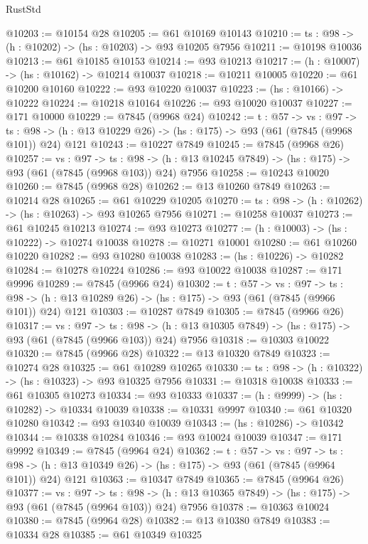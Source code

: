 \begin{lexlean}{RustStd}
\begin{coremodule}
@10203 := @10154 @28
@10205 := @61 @10169 @10143
@10210 := {ts : @98} -> (h : @10202) -> (hs : @10203) -> @93 @10205 @7956
@10211 := @10198 @10036
@10213 := @61 @10185 @10153
@10214 := @93 @10213
@10217 := (h : @10007) -> (hs : @10162) -> @10214 @10037
@10218 := @10211 @10005
@10220 := @61 @10200 @10160
@10222 := @93 @10220 @10037
@10223 := (hs : @10166) -> @10222
@10224 := @10218 @10164
@10226 := @93 @10020 @10037
@10227 := @171 @10000
@10229 := @7845 (@9968 @24)
@10242 := {t : @57} ->
  {vs : @97} ->
  {ts : @98} -> (h : @13 @10229 @26) -> (hs : @175) -> @93 (@61 (@7845 (@9968 @101)) @24) @121
@10243 := @10227 @7849
@10245 := @7845 (@9968 @26)
@10257 := {vs : @97} ->
  {ts : @98} -> (h : @13 @10245 @7849) -> (hs : @175) -> @93 (@61 (@7845 (@9968 @103)) @24) @7956
@10258 := @10243 @10020
@10260 := @7845 (@9968 @28)
@10262 := @13 @10260 @7849
@10263 := @10214 @28
@10265 := @61 @10229 @10205
@10270 := {ts : @98} -> (h : @10262) -> (hs : @10263) -> @93 @10265 @7956
@10271 := @10258 @10037
@10273 := @61 @10245 @10213
@10274 := @93 @10273
@10277 := (h : @10003) -> (hs : @10222) -> @10274 @10038
@10278 := @10271 @10001
@10280 := @61 @10260 @10220
@10282 := @93 @10280 @10038
@10283 := (hs : @10226) -> @10282
@10284 := @10278 @10224
@10286 := @93 @10022 @10038
@10287 := @171 @9996
@10289 := @7845 (@9966 @24)
@10302 := {t : @57} ->
  {vs : @97} ->
  {ts : @98} -> (h : @13 @10289 @26) -> (hs : @175) -> @93 (@61 (@7845 (@9966 @101)) @24) @121
@10303 := @10287 @7849
@10305 := @7845 (@9966 @26)
@10317 := {vs : @97} ->
  {ts : @98} -> (h : @13 @10305 @7849) -> (hs : @175) -> @93 (@61 (@7845 (@9966 @103)) @24) @7956
@10318 := @10303 @10022
@10320 := @7845 (@9966 @28)
@10322 := @13 @10320 @7849
@10323 := @10274 @28
@10325 := @61 @10289 @10265
@10330 := {ts : @98} -> (h : @10322) -> (hs : @10323) -> @93 @10325 @7956
@10331 := @10318 @10038
@10333 := @61 @10305 @10273
@10334 := @93 @10333
@10337 := (h : @9999) -> (hs : @10282) -> @10334 @10039
@10338 := @10331 @9997
@10340 := @61 @10320 @10280
@10342 := @93 @10340 @10039
@10343 := (hs : @10286) -> @10342
@10344 := @10338 @10284
@10346 := @93 @10024 @10039
@10347 := @171 @9992
@10349 := @7845 (@9964 @24)
@10362 := {t : @57} ->
  {vs : @97} ->
  {ts : @98} -> (h : @13 @10349 @26) -> (hs : @175) -> @93 (@61 (@7845 (@9964 @101)) @24) @121
@10363 := @10347 @7849
@10365 := @7845 (@9964 @26)
@10377 := {vs : @97} ->
  {ts : @98} -> (h : @13 @10365 @7849) -> (hs : @175) -> @93 (@61 (@7845 (@9964 @103)) @24) @7956
@10378 := @10363 @10024
@10380 := @7845 (@9964 @28)
@10382 := @13 @10380 @7849
@10383 := @10334 @28
@10385 := @61 @10349 @10325

\end{coremodule}
\end{lexlean}
